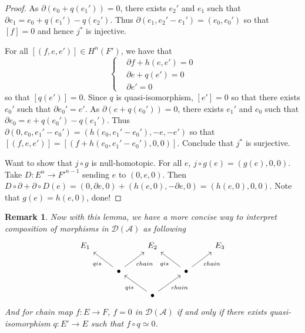 \documentclass{ctexart}
\newtheorem{remark}{Remark}[section]
\begin{document}
\begin{proof}
    As $\partial (e_{0} + q(e_{1}')) = 0$, there exists $e_{2}'$ and $e_{1}$ such that $\partial e_{1} = e_{0} + q(e_{1}') - q(e_{2}')$.
    Thus $\partial (e_{1}, e_{2}' - e_{1}') = (e_{0}, e_{0}')$ so that $[f] = 0$ and hence $j^{\ast}$ is injective.
    \par
    For all $[(f, e, e')]\in H^{n}(F')$, we have that
    \begin{equation}
        \left\{
            \begin{aligned}
                & \partial f + h(e, e') = 0 \\
                & \partial e + q(e') = 0 \\
                & \partial e' = 0
            \end{aligned}
        \right.
    \end{equation}
    so that $[q(e')] = 0$.
    Since $q$ is quasi-isomorphism, $[e'] = 0$ so that there exists $e_{0}'$ such that $\partial e_{0}' = e'$.
    As $\partial (e + q(e_{0}')) = 0$, there exists $e_{1}'$ and $e_{0}$ such that $\partial e_{0} = e + q(e_{0}') - q(e_{1}')$.
    Thus $\partial (0, e_{0}, e_{1}' - e_{0}') = (h(e_{0}, e_{1}' - e_{0}'), -e, -e')$ so that $[(f, e, e')] = [(f + h(e_{0}, e_{1}' - e_{0}'), 0, 0)]$.
    Conclude that $j^{\ast}$ is surjective.
    \par
    Want to show that $j \circ g$ is null-homotopic.
    For all $e$, $j \circ g(e) = (g(e), 0, 0)$.
    Take $D: E^{n} \rightarrow F'^{n - 1}$ sending $e$ to $(0, e, 0)$.
    Then $D \circ \partial + \partial \circ D(e) = (0, \partial e, 0) + (h(e, 0), -\partial e, 0) = (h(e, 0), 0, 0)$.
    Note that $g(e) = h(e, 0)$, done!
\end{proof}
\begin{remark}
    Now with this lemma, we have a more concise way to interpret composition of morphisms in $\mathcal{D}(\mathscr{A})$ as following
    \begin{equation}
        \begin{tikzcd}
            E_{1} && 
            E_{2} &&
            E_{3} \\
            & \bullet \arrow[ur, "chain" swap] \arrow[ul, "qis"] &&
            \bullet \arrow[ur, "chain" swap] \arrow[ul, "qis"] & \\
            && \bullet \arrow[ur, "chain" swap] \arrow[ul, "qis"] &&
        \end{tikzcd}
    \end{equation}
    And for chain map $f: E \rightarrow F$, $f = 0$ in $\mathcal{D}(\mathscr{A})$ if and only if there exists quasi-isomorphism $q: E' \rightarrow E$ such that $f \circ q \simeq 0$.
\end{remark}
\end{document}
